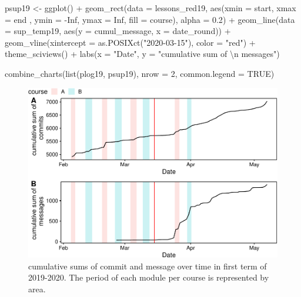 \documentclass[
]{article}
\newenvironment{Shaded}{\begin{snugshade}}{\end{snugshade}}
\newcommand{\AttributeTok}[1]{\textcolor[rgb]{0.77,0.63,0.00}{#1}}
\newcommand{\ConstantTok}[1]{\textcolor[rgb]{0.00,0.00,0.00}{#1}}
\newcommand{\DecValTok}[1]{\textcolor[rgb]{0.00,0.00,0.81}{#1}}
\newcommand{\FloatTok}[1]{\textcolor[rgb]{0.00,0.00,0.81}{#1}}
\newcommand{\FunctionTok}[1]{\textcolor[rgb]{0.00,0.00,0.00}{#1}}
\newcommand{\NormalTok}[1]{#1}
\newcommand{\OtherTok}[1]{\textcolor[rgb]{0.56,0.35,0.01}{#1}}
\newcommand{\SpecialCharTok}[1]{\textcolor[rgb]{0.00,0.00,0.00}{#1}}
\newcommand{\StringTok}[1]{\textcolor[rgb]{0.31,0.60,0.02}{#1}}
\begin{document}
\begin{Shaded}
\begin{Highlighting}[]
\NormalTok{psup19 }\OtherTok{\textless{}{-}} \FunctionTok{ggplot}\NormalTok{() }\SpecialCharTok{+}
  \FunctionTok{geom\_rect}\NormalTok{(}\AttributeTok{data =}\NormalTok{ lessons\_red19, }\FunctionTok{aes}\NormalTok{(}\AttributeTok{xmin =}\NormalTok{ start, }\AttributeTok{xmax =}\NormalTok{ end , }\AttributeTok{ymin =} \SpecialCharTok{{-}}\ConstantTok{Inf}\NormalTok{,  }\AttributeTok{ymax =} \ConstantTok{Inf}\NormalTok{, }\AttributeTok{fill =}\NormalTok{ course), }\AttributeTok{alpha =} \FloatTok{0.2}\NormalTok{) }\SpecialCharTok{+}
  \FunctionTok{geom\_line}\NormalTok{(}\AttributeTok{data =}\NormalTok{ sup\_temp19, }\FunctionTok{aes}\NormalTok{(}\AttributeTok{y =}\NormalTok{ cumul\_message, }\AttributeTok{x =}\NormalTok{ date\_round)) }\SpecialCharTok{+}
  \FunctionTok{geom\_vline}\NormalTok{(}\AttributeTok{xintercept =} \FunctionTok{as.POSIXct}\NormalTok{(}\StringTok{"2020{-}03{-}15"}\NormalTok{), }\AttributeTok{color =} \StringTok{"red"}\NormalTok{) }\SpecialCharTok{+}
  \FunctionTok{theme\_sciviews}\NormalTok{() }\SpecialCharTok{+}
  \FunctionTok{labs}\NormalTok{(}\AttributeTok{x =} \StringTok{"Date"}\NormalTok{, }\AttributeTok{y =} \StringTok{"cumulative sum of  }\SpecialCharTok{\textbackslash{}n}\StringTok{ messages"}\NormalTok{)}

\FunctionTok{combine\_charts}\NormalTok{(}\FunctionTok{list}\NormalTok{(plog19, psup19), }\AttributeTok{nrow =} \DecValTok{2}\NormalTok{, }\AttributeTok{common.legend =} \ConstantTok{TRUE}\NormalTok{)}
\end{Highlighting}
\end{Shaded}

\begin{figure}
\centering
\includegraphics{teaching_data_science_files/figure-latex/unnamed-chunk-4-1.pdf}
\caption{cumulative sums of commit and message over time in first term
of 2019-2020. The period of each module per course is represented by
area.}
\end{figure}
\end{document}
